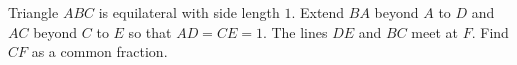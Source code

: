 Triangle $ABC$ is equilateral with side length $1$. Extend $BA$ beyond $A$ to $D$ and $AC$ beyond $C$ to $E$ so that $AD=CE=1$. The lines $DE$ and $BC$ meet at $F$. Find $CF$ as a common fraction.

